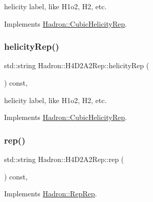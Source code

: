 helicity label, like H1o2, H2, etc. 

Implements \mbox{\hyperlink{structHadron_1_1CubicHelicityRep_af1096946b7470edf0a55451cc662f231}{Hadron\+::\+Cubic\+Helicity\+Rep}}.

\mbox{\label{structHadron_1_1H4D2A2Rep_acefae4ce29aeb8f45ae4976209500037}} 
\subsubsection{\texorpdfstring{helicityRep()}{helicityRep()}\hspace{0.1cm}{\footnotesize\ttfamily [3/3]}}
{\footnotesize\ttfamily std\+::string Hadron\+::\+H4\+D2\+A2\+Rep\+::helicity\+Rep (\begin{DoxyParamCaption}{ }\end{DoxyParamCaption}) const\hspace{0.3cm}{\ttfamily [inline]}, {\ttfamily [virtual]}}

helicity label, like H1o2, H2, etc. 

Implements \mbox{\hyperlink{structHadron_1_1CubicHelicityRep_af1096946b7470edf0a55451cc662f231}{Hadron\+::\+Cubic\+Helicity\+Rep}}.

\mbox{\label{structHadron_1_1H4D2A2Rep_a144c2d98d82e71971a810610f10199d3}} 
\subsubsection{\texorpdfstring{rep()}{rep()}\hspace{0.1cm}{\footnotesize\ttfamily [1/5]}}
{\footnotesize\ttfamily std\+::string Hadron\+::\+H4\+D2\+A2\+Rep\+::rep (\begin{DoxyParamCaption}{ }\end{DoxyParamCaption}) const\hspace{0.3cm}{\ttfamily [inline]}, {\ttfamily [virtual]}}



Implements \mbox{\hyperlink{structHadron_1_1RepRep_ab3213025f6de249f7095892109575fde}{Hadron\+::\+Rep\+Rep}}.

\mbox{\label{structHadron_1_1H4D2A2Rep_a144c2d98d82e71971a810610f10199d3}} 
